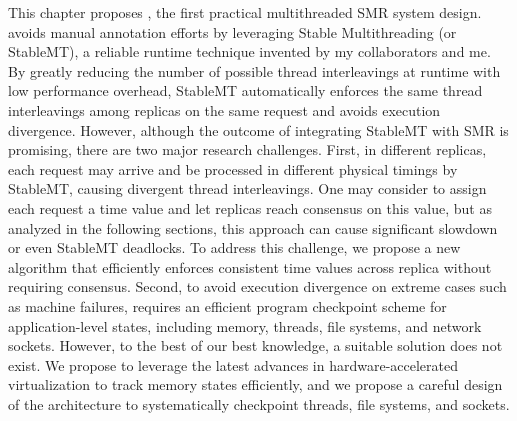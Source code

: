 
This chapter proposes \crane, the first practical multithreaded SMR system
design.
\crane avoids manual annotation efforts by leveraging Stable
Multithreading (or StableMT), a reliable runtime technique invented by my
collaborators and me. By greatly reducing the number of possible thread
interleavings at runtime with low performance overhead, StableMT automatically
enforces the same thread interleavings among replicas on the same request and
avoids
execution divergence. However, although the outcome of integrating StableMT with
SMR is promising,
there are two major research challenges. First, in different replicas, each
request may arrive and be processed in different physical timings by StableMT,
causing divergent thread interleavings. One may consider to assign each request
a time value and let replicas reach consensus on this value, but as analyzed in
the following sections, this approach can cause significant slowdown or even
StableMT deadlocks. To address this challenge, we propose a new algorithm that
efficiently enforces consistent time values across replica without requiring
consensus. Second, to avoid execution divergence on extreme cases such as
machine failures, 
\crane requires an efficient program checkpoint scheme for application-level
states, including memory, threads, file systems, and network sockets. However,
to the best of our best knowledge, a suitable solution does not exist. We
propose to leverage the latest advances in hardware-accelerated virtualization
to track memory states efficiently, and we propose a careful design of the
\crane architecture to systematically checkpoint threads, file systems, and sockets.

